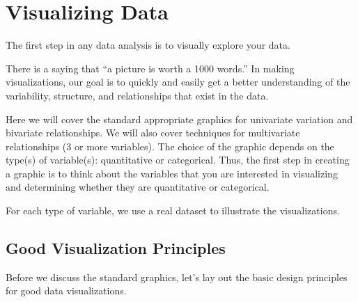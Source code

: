 \documentclass[
]{book}
\begin{document}
\chapter{Visualizing Data}\label{visualizing-data}

The first step in any data analysis is to visually explore your data.

There is a saying that ``a picture is worth a 1000 words.'' In making visualizations, our goal is to quickly and easily get a better understanding of the variability, structure, and relationships that exist in the data.

Here we will cover the standard appropriate graphics for univariate variation and bivariate relationships. We will also cover techniques for multivariate relationships (3 or more variables). The choice of the graphic depends on the type(s) of variable(s): quantitative or categorical. Thus, the first step in creating a graphic is to think about the variables that you are interested in visualizing and determining whether they are quantitative or categorical.

For each type of variable, we use a real dataset to illustrate the visualizations.

\section{Good Visualization Principles}\label{good-visualization-principles}

Before we discuss the standard graphics, let's lay out the basic design principles for good data visualizations.
\end{document}
